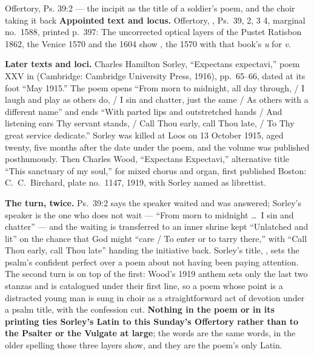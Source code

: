 \begin{afterlife}{Offertory, Ps. 39:2 --- the incipit as the title of a soldier's poem, and the choir taking it back}
\textbf{Appointed text and locus.} Offertory, ,
Ps.~39, 2, 3  4, marginal no.~1588, printed p.~397:  The uncorrected optical layers of the Pustet Ratisbon
1862, the Venice 1570 and the 1604  show , the 1570 with that book's \emph{u} for \emph{v}.

\textbf{Later texts and loci.} Charles Hamilton Sorley, ``Expectans expectavi,''
poem XXV in  (Cambridge: Cambridge University
Press, 1916), pp.~65--66, dated at its foot ``May 1915.'' The poem opens ``From
morn to midnight, all day through, / I laugh and play as others do, / I sin and
chatter, just the same / As others with a different name'' and ends ``With parted
lips and outstretched hands / And listening ears Thy servant stands, / Call Thou
early, call Thou late, / To Thy great service dedicate.'' Sorley was killed at
Loos on 13 October 1915, aged twenty, five months after the date under the poem,
and the volume was published posthumously. Then Charles Wood, ``Expectans
Expectavi,'' alternative title ``This sanctuary of my soul,'' for mixed chorus and
organ, first published Boston: C.~C.\ Birchard, plate no.~1147, 1919, with Sorley
named as librettist.

\textbf{The turn, twice.} Ps.\ 39:2 says the speaker waited and was answered;
Sorley's speaker is the one who does not wait --- ``From morn to midnight \dots\ I
sin and chatter'' --- and the waiting is transferred to an inner shrine kept
``Unlatched and lit'' on the chance that God might ``care / To enter or to tarry
there,'' with ``Call Thou early, call Thou late'' handing the initiative back.
Sorley's title, , sets the psalm's confident perfect
over a poem about not having been paying attention. The second turn is on top of
the first: Wood's 1919 anthem sets only
the last two stanzas and is catalogued under their first line, so a poem whose
point is a distracted young man is sung in choir as a straightforward act of
devotion under a psalm title, with the confession cut. \textbf{Nothing in the
poem or in its printing ties Sorley's Latin to this Sunday's Offertory rather
than to the Psalter or the Vulgate at large}; the words are the same words, in
the older spelling those three layers show, and they are the poem's only Latin.
\end{afterlife}

